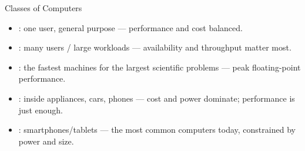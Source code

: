 \documentclass[aspectratio=169]{beamer}
\begin{document}
\begin{frame}{Classes of Computers}
  \begin{itemize}
    \item {}: one user, general purpose --- performance
      and cost balanced.
    \item {}: many users / large workloads --- availability
      and throughput matter most.
    \item {}: the fastest machines for the largest
      scientific problems --- peak floating-point performance.
    \item {}: inside appliances, cars, phones --- cost and
      power dominate; performance is just enough.
    \item {}: smartphones/tablets --- the most
      common computers today, constrained by power and size.
  \end{itemize}
  \vspace{0.2cm}
\end{frame}
\end{document}
